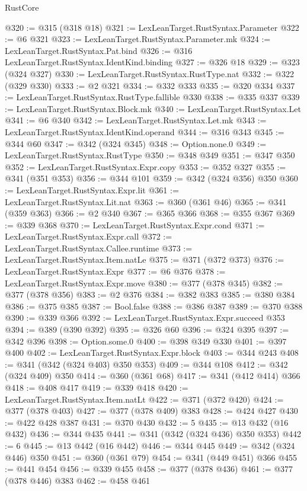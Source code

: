 \begin{lexlean}{RustCore}
\begin{coremodule}
@320 := @315 (@318 @18)
@321 := LexLeanTarget.RustSyntax.Parameter
@322 := @6 @321
@323 := LexLeanTarget.RustSyntax.Parameter.mk
@324 := LexLeanTarget.RustSyntax.Pat.bind
@326 := @316 LexLeanTarget.RustSyntax.IdentKind.binding
@327 := @326 @18
@329 := @323 (@324 @327)
@330 := LexLeanTarget.RustSyntax.RustType.nat
@332 := @322 (@329 @330)
@333 := @2 @321
@334 := @332 @333
@335 := @320 @334
@337 := LexLeanTarget.RustSyntax.RustType.fallible @330
@338 := @335 @337
@339 := LexLeanTarget.RustSyntax.Block.mk
@340 := LexLeanTarget.RustSyntax.Let
@341 := @6 @340
@342 := LexLeanTarget.RustSyntax.Let.mk
@343 := LexLeanTarget.RustSyntax.IdentKind.operand
@344 := @316 @343
@345 := @344 @60
@347 := @342 (@324 @345)
@348 := Option.none.{0}
@349 := LexLeanTarget.RustSyntax.RustType
@350 := @348 @349
@351 := @347 @350
@352 := LexLeanTarget.RustSyntax.Expr.copy
@353 := @352 @327
@355 := @341 (@351 @353)
@356 := @344 @101
@359 := @342 (@324 @356) @350
@360 := LexLeanTarget.RustSyntax.Expr.lit
@361 := LexLeanTarget.RustSyntax.Lit.nat
@363 := @360 (@361 @46)
@365 := @341 (@359 @363)
@366 := @2 @340
@367 := @365 @366
@368 := @355 @367
@369 := @339 @368
@370 := LexLeanTarget.RustSyntax.Expr.cond
@371 := LexLeanTarget.RustSyntax.Expr.call
@372 := LexLeanTarget.RustSyntax.Callee.runtime
@373 := LexLeanTarget.RustSyntax.Item.natLe
@375 := @371 (@372 @373)
@376 := LexLeanTarget.RustSyntax.Expr
@377 := @6 @376
@378 := LexLeanTarget.RustSyntax.Expr.move
@380 := @377 (@378 @345)
@382 := @377 (@378 @356)
@383 := @2 @376
@384 := @382 @383
@385 := @380 @384
@386 := @375 @385
@387 := Bool.false
@388 := @386 @387
@389 := @370 @388
@390 := @339 @366
@392 := LexLeanTarget.RustSyntax.Expr.succeed @353
@394 := @389 (@390 @392)
@395 := @326 @60
@396 := @324 @395
@397 := @342 @396
@398 := Option.some.{0}
@400 := @398 @349 @330
@401 := @397 @400
@402 := LexLeanTarget.RustSyntax.Expr.block
@403 := @344 @243
@408 := @341 (@342 (@324 @403) @350 @353)
@409 := @344 @108
@412 := @342 (@324 @409) @350
@414 := @360 (@361 @68)
@417 := @341 (@412 @414) @366
@418 := @408 @417
@419 := @339 @418
@420 := LexLeanTarget.RustSyntax.Item.natLt
@422 := @371 (@372 @420)
@424 := @377 (@378 @403)
@427 := @377 (@378 @409) @383
@428 := @424 @427
@430 := @422 @428 @387
@431 := @370 @430
@432 := 5
@435 := @13 @432 (@16 @432)
@436 := @344 @435
@441 := @341 (@342 (@324 @436) @350 @353)
@442 := 6
@445 := @13 @442 (@16 @442)
@446 := @344 @445
@449 := @342 (@324 @446) @350
@451 := @360 (@361 @79)
@454 := @341 (@449 @451) @366
@455 := @441 @454
@456 := @339 @455
@458 := @377 (@378 @436)
@461 := @377 (@378 @446) @383
@462 := @458 @461

\end{coremodule}
\end{lexlean}
